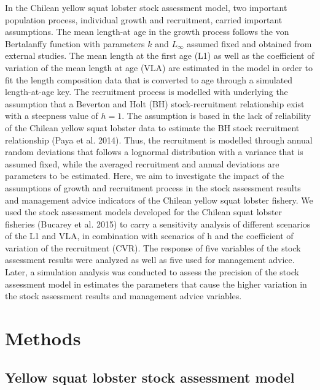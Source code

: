 \documentclass[11pt,letter,]{article}
\begin{document}
In the Chilean yellow squat lobster stock assessment model, two
important population process, individual growth and recruitment, carried
important assumptions. The mean length-at age in the growth process
follows the von Bertalanffy function with parameters \(k\) and
\(L_{\infty}\) assumed fixed and obtained from external studies. The
mean length at the first age (L1) as well as the coefficient of
variation of the mean length at age (VLA) are estimated in the model in
order to fit the length composition data that is converted to age
through a simulated length-at-age key. The recruitment process is
modelled with underlying the assumption that a Beverton and Holt (BH)
stock-recruitment relationship exist with a steepness value of \(h=1\).
The assumption is based in the lack of reliability of the Chilean yellow
squat lobster data to estimate the BH stock recruitment relationship
(Paya et al. 2014). Thus, the recruitment is modelled through annual
random deviations that follows a lognormal distribution with a variance
that is assumed fixed, while the averaged recruitment and annual
deviations are parameters to be estimated. Here, we aim to investigate
the impact of the assumptions of growth and recruitment process in the
stock assessment results and management advice indicators of the Chilean
yellow squat lobster fishery. We used the stock assessment models
developed for the Chilean squat lobster fisheries (Bucarey et al. 2015)
to carry a sensitivity analysis of different scenarios of the L1 and
VLA, in combination with scenarios of h and the coefficient of variation
of the recruitment (CVR). The response of five variables of the stock
assessment results were analyzed as well as five used for management
advice. Later, a simulation analysis was conducted to assess the
precision of the stock assessment model in estimates the parameters that
cause the higher variation in the stock assessment results and
management advice variables.

\section{Methods}\label{methods}

\subsection{Yellow squat lobster stock assessment
model}\label{yellow-squat-lobster-stock-assessment-model}
\end{document}
